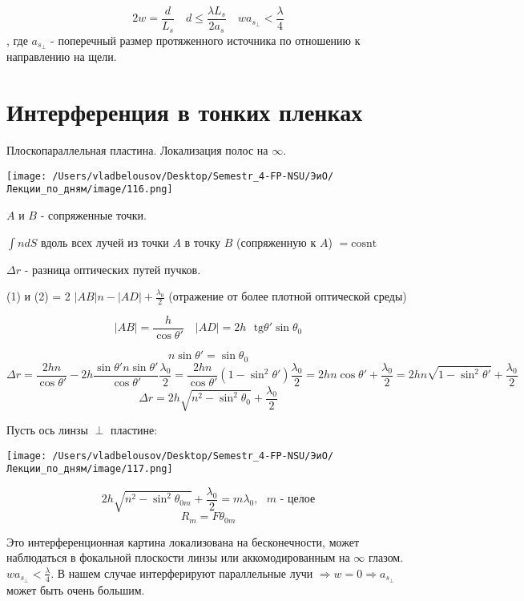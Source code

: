 \documentclass[12pt, a4paper]{report}
\begin{document}
\[ 2 w = \frac{d}{L_s } \quad  d \le \frac{\lambda L_s}{2 a_{s} } \quad  w a_{s_{\perp } }  <    \frac{\lambda}{4} \] 
, где \( a_{s_{ \perp } }  \) - поперечный размер протяженного источника по отношению к направлению на щели. 

\section{Интерференция в тонких пленках}

Плоскопараллельная пластина. Локализация полос на \( \infty  \). 

\begin{center}
    \texttt{[image: /Users/vladbelousov/Desktop/Semestr\_4-FP-NSU/ЭиО/Лекции\_по\_дням/image/116.png]}
\end{center}
\( A \) и \( B \) - сопряженные точки.

\( \int n d S  \) вдоль всех лучей из точки \( A \) в точку \( B \)  (сопряженную к \( A \)) \( = \mathrm{cosnt}   \) 

\( \Delta r  \)  - разница оптических путей пучков. 

(1) и (2) = 2 \( |AB|n - \displaystyle  |AD| + \frac{\lambda_0}{2}  \) (отражение от более плотной оптической среды)

\[ |AB | = \frac{h}{\cos \theta' } \quad  |AD| = 2 h \text{ } \mathrm{ tg}   \theta ' \sin  \theta_0 \]  

\[  n \sin \theta ' = \sin \theta_0  \] 
\[ \Delta r = \frac{2hn}{\cos \theta ' }- 2h \frac{\sin  \theta ' n \sin \theta ' }{\cos \theta ' } \frac{\lambda_0}{2 }  = \frac{2hn}{\cos  \theta' } (1 - \sin  ^2 \theta ' ) \frac{\lambda_0}{2 }  = 2hn \cos \theta ' + \frac{\lambda_0}{2 }  = 2hn \sqrt{1 - \sin  ^2 \theta ' }   + \frac{\lambda_0}{2 }   \] 
\[ \Delta r = 2 h \sqrt{n ^2 - \sin  ^2 \theta_0 } + \frac{\lambda_0}{2 }  \] 

Пусть ось линзы \( \perp   \) пластине: 

\begin{center}
    \texttt{[image: /Users/vladbelousov/Desktop/Semestr\_4-FP-NSU/ЭиО/Лекции\_по\_дням/image/117.png]}
\end{center}

\[ 2 h \sqrt{n ^2 - \sin  ^2 \theta_{0m }  } + \frac{\lambda_0}{2 }  = m \lambda_0 , \text{ }  m \text{ - целое}  \] 
\[ R_m = F \theta_{0m}  \] 

Это интерференционная картина локализована на бесконечности, может наблюдаться в фокальной плоскости линзы или аккомодированным на \( \infty  \) глазом. \( w a_{s_{\perp } } < \displaystyle \frac{\lambda}{4}   \). В нашем случае интерферируют параллельные лучи \( \Rightarrow w = 0 \Rightarrow a_{s _{\perp  } }   \) может быть очень большим.
\end{document}
